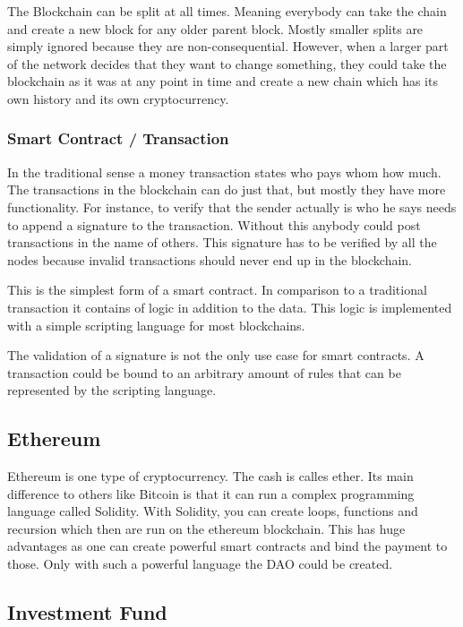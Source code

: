 \documentclass[a4paper, 11pt]{scrartcl}
\begin{document}
The Blockchain can be split at all times.
Meaning everybody can take the chain and create a new block for any older parent block.
Mostly smaller splits are simply ignored because they are non-consequential.
However, when a larger part of the network decides that they want to change something, they could take the blockchain as it was at any point in time and create a new chain which has its own history and its own cryptocurrency. \cite{blockchainKai}

\subsubsection{Smart Contract / Transaction}

In the traditional sense a money transaction states who pays whom how much.
The transactions in the blockchain can do just that, but mostly they have more functionality.
For instance, to verify that the sender actually is who he says needs to append a signature to the transaction.
Without this anybody could post transactions in the name of others.
This signature has to be verified by all the nodes because invalid transactions should never end up in the blockchain. \cite{blockchainKai}

This is the simplest form of a smart contract.
In comparison to a traditional transaction it contains of logic in addition to the data.
This logic is implemented with a simple scripting language for most blockchains. \cite{blockchainKai}

The validation of a signature is not the only use case for smart contracts.
A transaction could be bound to an arbitrary amount of rules that can be represented by the scripting language. \cite{blockchainKai}

\subsection{Ethereum}

Ethereum is one type of cryptocurrency.
The cash is calles ether.
Its main difference to others like Bitcoin is that it can run a complex programming language called Solidity.
With Solidity, you can create loops, functions and recursion which then are run on the ethereum blockchain.
This has huge advantages as one can create powerful smart contracts and bind the payment to those.
Only with such a powerful language the DAO could be created. \cite{eth}

\subsection{Investment Fund}
\end{document}
